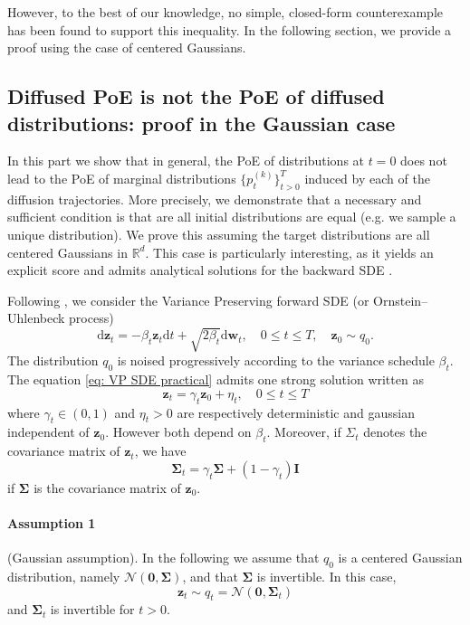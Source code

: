 \documentclass[10pt]{article} %
\def\rvz{{\mathbf{z}}}
\def\vzero{{\bm{0}}}
\def\mI{{\bm{I}}}
\def\mSigma{{\bm{\Sigma}}}
\newcommand{\R}{\mathbb{R}}
\begin{document}
However, to the best of our knowledge, no simple, closed-form counterexample has been found to support this inequality. In the following section, we provide a proof using the case of centered Gaussians.

\subsection{Diffused PoE is not the PoE of diffused distributions: proof in the Gaussian case}\label{app: diffused poe is not poe: gaussian case}

In this part we show that in general, the PoE of distributions at $t = 0$ does not lead to the PoE of marginal distributions $\{p_t^{(k)}\}_{t>0}^{T}$ induced by each of the diffusion trajectories. More precisely, we demonstrate that a necessary and sufficient condition is that are all initial distributions are equal (e.g. we sample a unique distribution). We prove this assuming the target distributions are all centered Gaussians in $\R^d$. This case is particularly interesting, as it yields an explicit score and admits analytical solutions for the backward SDE \citep{pierret2024diffusion}.

Following \citet{pierret2024diffusion}, 
we consider the Variance Preserving forward SDE (or Ornstein–Uhlenbeck process)
\begin{equation}\label{eq: VP SDE practical}
\mathrm{d}\rvz_t = -\beta_t \rvz_t \mathrm{d}t + \sqrt{2\beta_t} \mathrm{d}\mathbf{w}_t, \quad 0 \leq t \leq T, \quad \rvz_0 \sim q_0.
\end{equation}
The distribution $q_0$ is noised progressively according to the variance schedule $\beta_t$. The equation \ref{eq: VP SDE practical} admits one strong solution written as
\begin{equation}
\rvz_t = \gamma_t \rvz_0 + \eta_t, \quad 0 \leq t \leq T
\end{equation}
where $\gamma_t \in (0,1)$ and $\eta_t>0$ are respectively deterministic and gaussian independent of $\rvz_0$. However both depend on $\beta_t$. Moreover, if $\Sigma_t$ denotes the covariance matrix of $\rvz_t$, we have 
\begin{equation}
\mSigma_t = \gamma_t \mSigma + (1 - \gamma_t)\mI
\end{equation}
if $\mSigma$ is the covariance matrix of $\rvz_0$. 

\paragraph{Assumption 1}(Gaussian assumption). In the following we assume that $q_0$ is a centered Gaussian distribution, namely $\mathcal{N}(\vzero,\mSigma)$, and that $\mSigma$ is invertible. In this case,
\begin{equation}\label{eq: gaussian assumption}
\rvz_t \sim q_t = \mathcal{N}(\vzero,\mSigma_t)
\end{equation}
and $\mSigma_t$ is invertible for $t>0$.
\end{document}
